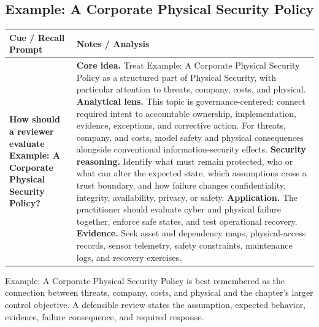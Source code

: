 \documentclass[11pt]{article}
\newcommand{\CornellHeader}{%
\rowcolor{Navy}\color{white}\bfseries Cue / Recall Prompt & \color{white}\bfseries Notes / Analysis\\\hline}
\newcommand{\CornellRow}[2]{%
\cellcolor{CueGray}\RaggedRight\textbf{#1} & \RaggedRight #2\\\hline}
\begin{document}
\subsection*{Example: A Corporate Physical Security Policy}
\begin{longtable}{>{\RaggedRight\arraybackslash}p{}|>{\RaggedRight\arraybackslash}p{}}
\CornellHeader
\CornellRow{How should a reviewer evaluate Example: A Corporate Physical Security Policy?}{\textbf{Core idea.} Treat Example: A Corporate Physical Security Policy as a structured part of Physical Security, with particular attention to threats, company, costs, and physical. \textbf{Analytical lens.} This topic is governance-centered: connect required intent to accountable ownership, implementation, evidence, exceptions, and corrective action. For threats, company, and costs, model safety and physical consequences alongside conventional information-security effects. \textbf{Security reasoning.} Identify what must remain protected, who or what can alter the expected state, which assumptions cross a trust boundary, and how failure changes confidentiality, integrity, availability, privacy, or safety. \textbf{Application.} The practitioner should evaluate cyber and physical failure together, enforce safe states, and test operational recovery. \textbf{Evidence.} Seek asset and dependency maps, physical-access records, sensor telemetry, safety constraints, maintenance logs, and recovery exercises.}
\end{longtable}
\begin{topicsummary}
Example: A Corporate Physical Security Policy is best remembered as the connection between threats, company, costs, and physical and the chapter's larger control objective. A defensible review states the assumption, expected behavior, evidence, failure consequence, and required response.
\end{topicsummary}
\end{document}
